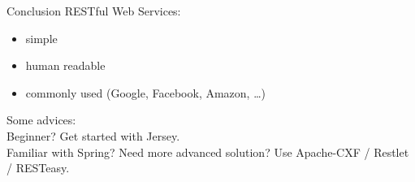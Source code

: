 \begin{frame}{Conclusion}
	RESTful Web Services: 
	\begin{itemize}
	  \item simple
	  \item human readable
	  \item commonly used (Google, Facebook, Amazon, \ldots)
	\end{itemize} 

	\vspace{1cm}

	Some advices: \\	
	Beginner? Get started with Jersey. \\
	Familiar with Spring? Need more advanced solution? Use Apache-CXF / Restlet / RESTeasy.
\end{frame}

 